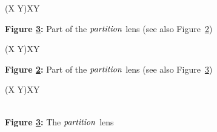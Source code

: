 \ifdissertation
\begin{figure}[t!]
{\partition \in (X \oplus Y)\LIST \lens X\LIST \otimes Y\LIST}
{
    \partitionauxdef
\\[1.5ex]
    \partitiondputlgdef
}
\singlespacing
\begin{center}
\makeatletter{}\makeatother
\label{fig:definition-partition}
{\bf Figure \ref{fig:definition-partition}:} Part of the $\mathit{partition}$ lens
(see also Figure~\ref{fig:definition-partition-part-2})
\end{center}
\draftspaced
\end{figure}
\begin{figure}[t!]
{\partition \in (X \oplus Y)\LIST \lens X\LIST \otimes Y\LIST}
{\partitiondputrgdef}
\singlespacing
\begin{center}
\makeatletter{}\makeatother
\label{fig:definition-partition-part-2}
{\bf Figure \ref{fig:definition-partition-part-2}:} Part of the $\mathit{partition}$ lens
(see also Figure~\ref{fig:definition-partition})
\end{center}
\draftspaced
\end{figure}
\newcommand{\partitionfigures}{Figures~\ref{fig:definition-partition},~\ref{fig:definition-partition-part-2}, and~\ref{fig:definition-partition-supplementary}\xspace}
\else
\begin{figure}[t!]
{\partition \in (X \oplus Y)\LIST \lens X\LIST \otimes Y\LIST}
{
    \partitionauxdef
\\[1.5ex]
    \partitiondputrgdef
\\[5ex]
    \partitiondputlgdef
}
\begin{center}
\makeatletter{}\makeatother
\label{fig:definition-partition}
{\bf Figure \ref{fig:definition-partition}:} The $\mathit{partition}$ lens
\end{center}
\end{figure}
\newcommand{\partitionfigures}{Figures~\ref{fig:definition-partition} and~\ref{fig:definition-partition-supplementary}\xspace}
\fi%

